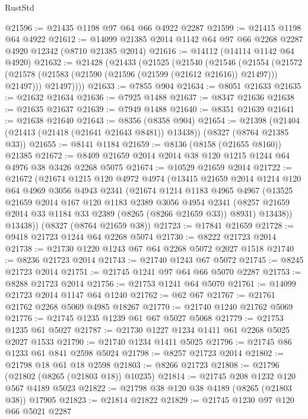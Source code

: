 \begin{lexlean}{RustStd}
\begin{coremodule}
@21596 := @21435 @1198 @97 @64 @66 @4922 @2287
@21599 := @21415 @1198 @64 @4922
@21612 := @14099 @21385 @2014 @1142 @64 @97 @66 @2268 @2287 @4920 @12342 (@8710 @21385 @2014)
@21616 := @14112 (@14114 @1142 @64 @4920)
@21632 := @21428
    (@21433
      (@21525
        (@21540
          (@21546
            (@21554
              (@21572 (@21578 (@21583 (@21590 (@21596 (@21599 (@21612 @21616)) @21497))) @21497)))
            @21497))))
@21633 := @7855 @904
@21634 := @8051 @21633
@21635 := @21632 @21634
@21636 := @7925 @1488
@21637 := @8347 @21636
@21638 := @21635 @21637
@21639 := @7949 @1488
@21640 := @8351 @21639
@21641 := @21638 @21640
@21643 := @8356 (@8358 @904)
@21654 := @21398 (@21404 (@21413 (@21418 (@21641 @21643 @8481)) @13438)) (@8327 (@8764 @21385 @33))
@21655 := @8141 @1184
@21659 := @8136 (@8158 (@21655 @8160)) @21385
@21672 := @8409 @21659 @2014 @2014 @38 @120 @1215 @1244 @64 @4976 @38 @3426 @2268 @5075
@21674 := @10529 @21659 @2014
@21722 := @21672
    (@21674
      @1215
      @120
      @4972
      @4974
      (@13415
        @21659
        @2014
        @1214
        @120
        @64
        @4969
        @3056
        @4943
        @2341
        (@21674
          @1214
          @1183
          @4965
          @4967
          (@13525
            @21659
            @2014
            @167
            @120
            @1183
            @2389
            @3056
            @4954
            @2341
            (@8257 @21659 @2014 @33 @1184 @33 @2389 (@8265 (@8266 @21659 @33)) @8931)
            @13438))
        @13438))
    (@8327 (@8764 @21659 @38))
@21723 := @17841 @21659
@21728 := @9418 @21723 @1244 @64 @2268 @5074
@21730 := @8222 @21723 @2014
@21738 := @21730 @1220 @1243 @67 @64 @2268 @5072 @2027 @1518
@21740 := @8236 @21723 @2014
@21743 := @21740 @1243 @67 @5072
@21745 := @8245 @21723 @2014
@21751 := @21745 @1241 @97 @64 @66 @5070 @2287
@21753 := @8288 @21723 @2014
@21756 := @21753 @1241 @64 @5070
@21761 := @14099 @21723 @2014 @1147 @64 @1240
@21762 := @62 @67
@21767 := @21761 @21762 @2268 @5069 @4985 @18267
@21770 := @21740 @1240 @21762 @5069
@21776 := @21745 @1235 @1239 @61 @67 @5027 @5068
@21779 := @21753 @1235 @61 @5027
@21787 := @21730 @1227 @1234 @1411 @61 @2268 @5025 @2027 @1533
@21790 := @21740 @1234 @1411 @5025
@21796 := @21745 @86 @1233 @61 @841 @2598 @5024
@21798 := @8257 @21723 @2014
@21802 := @21798 @18 @61 @18 @2598
@21803 := @8266 @21723
@21808 := @21796 (@21802 (@8265 (@21803 @18)) @10235)
@21814 := @21745 @208 @1232 @120 @567 @4189 @5023
@21822 := @21798 @38 @120 @38 @4189 (@8265 (@21803 @38)) @17905
@21823 := @21814 @21822
@21829 := @21745 @1230 @97 @120 @66 @5021 @2287

\end{coremodule}
\end{lexlean}
